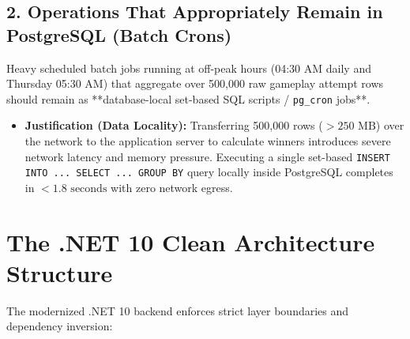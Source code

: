 \subsection{2. Operations That Appropriately Remain in PostgreSQL (Batch Crons)}
Heavy scheduled batch jobs running at off-peak hours (04:30 AM daily and Thursday 05:30 AM) that aggregate over 500,000 raw gameplay attempt rows should remain as **database-local set-based SQL scripts / \texttt{pg\_cron} jobs**. 
\begin{itemize}
    \item \textbf{Justification (Data Locality):} Transferring 500,000 rows ($> 250\text{ MB}$) over the network to the application server to calculate winners introduces severe network latency and memory pressure. Executing a single set-based \texttt{INSERT INTO ... SELECT ... GROUP BY} query locally inside PostgreSQL completes in $< 1.8\text{ seconds}$ with zero network egress.
\end{itemize}

\section{The .NET 10 Clean Architecture Structure}
The modernized .NET 10 backend enforces strict layer boundaries and dependency inversion:

